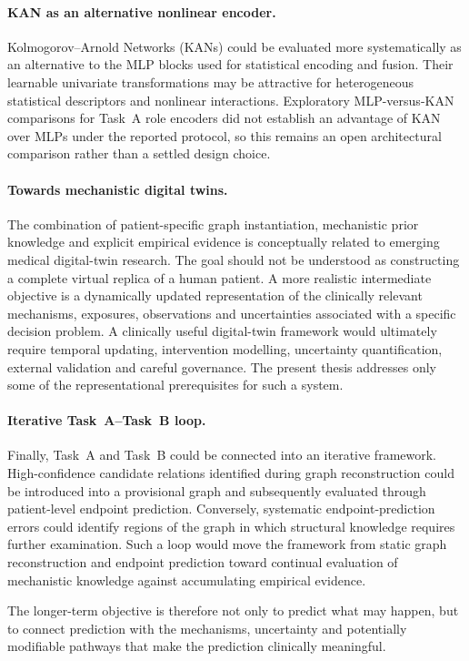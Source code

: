 \paragraph{KAN as an alternative nonlinear encoder.}
Kolmogorov--Arnold Networks (KANs) could be evaluated more systematically as an
alternative to the MLP blocks used for statistical encoding and fusion. Their learnable
univariate transformations may be attractive for heterogeneous statistical descriptors and
nonlinear interactions.
Exploratory MLP-versus-KAN comparisons for Task~A role encoders did not establish an
advantage of KAN over MLPs under the reported protocol, so this remains an open
architectural comparison rather than a settled design choice.

\paragraph{Towards mechanistic digital twins.}
The combination of patient-specific graph instantiation, mechanistic prior knowledge and
explicit empirical evidence is conceptually related to emerging medical digital-twin
research. The goal should not be understood as constructing a complete virtual replica of
a human patient. A more realistic intermediate objective is a dynamically updated
representation of the clinically relevant mechanisms, exposures, observations and
uncertainties associated with a specific decision problem.
A clinically useful digital-twin framework would ultimately require temporal updating,
intervention modelling, uncertainty quantification, external validation and careful
governance. The present thesis addresses only some of the representational prerequisites
for such a system.

\paragraph{Iterative Task~A--Task~B loop.}
Finally, Task~A and Task~B could be connected into an iterative framework. High-confidence
candidate relations identified during graph reconstruction could be introduced into a
provisional graph and subsequently evaluated through patient-level endpoint prediction.
Conversely, systematic endpoint-prediction errors could identify regions of the graph in
which structural knowledge requires further examination.
Such a loop would move the framework from static graph reconstruction and endpoint
prediction toward continual evaluation of mechanistic knowledge against accumulating
empirical evidence.

The longer-term objective is therefore not only to predict what may happen, but to connect
prediction with the mechanisms, uncertainty and potentially modifiable pathways that make
the prediction clinically meaningful.

